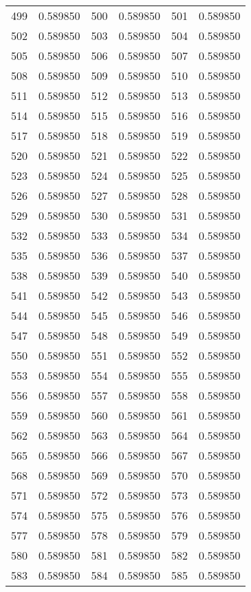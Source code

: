 \documentclass[12pt]{article}
\begin{document}
\begin{longtable}{@{}cc|cc|cc@{}}
499 & 0.589850 & 500 & 0.589850 & 501 & 0.589850 \\
502 & 0.589850 & 503 & 0.589850 & 504 & 0.589850 \\
505 & 0.589850 & 506 & 0.589850 & 507 & 0.589850 \\
508 & 0.589850 & 509 & 0.589850 & 510 & 0.589850 \\
511 & 0.589850 & 512 & 0.589850 & 513 & 0.589850 \\
514 & 0.589850 & 515 & 0.589850 & 516 & 0.589850 \\
517 & 0.589850 & 518 & 0.589850 & 519 & 0.589850 \\
520 & 0.589850 & 521 & 0.589850 & 522 & 0.589850 \\
523 & 0.589850 & 524 & 0.589850 & 525 & 0.589850 \\
526 & 0.589850 & 527 & 0.589850 & 528 & 0.589850 \\
529 & 0.589850 & 530 & 0.589850 & 531 & 0.589850 \\
532 & 0.589850 & 533 & 0.589850 & 534 & 0.589850 \\
535 & 0.589850 & 536 & 0.589850 & 537 & 0.589850 \\
538 & 0.589850 & 539 & 0.589850 & 540 & 0.589850 \\
541 & 0.589850 & 542 & 0.589850 & 543 & 0.589850 \\
544 & 0.589850 & 545 & 0.589850 & 546 & 0.589850 \\
547 & 0.589850 & 548 & 0.589850 & 549 & 0.589850 \\
550 & 0.589850 & 551 & 0.589850 & 552 & 0.589850 \\
553 & 0.589850 & 554 & 0.589850 & 555 & 0.589850 \\
556 & 0.589850 & 557 & 0.589850 & 558 & 0.589850 \\
559 & 0.589850 & 560 & 0.589850 & 561 & 0.589850 \\
562 & 0.589850 & 563 & 0.589850 & 564 & 0.589850 \\
565 & 0.589850 & 566 & 0.589850 & 567 & 0.589850 \\
568 & 0.589850 & 569 & 0.589850 & 570 & 0.589850 \\
571 & 0.589850 & 572 & 0.589850 & 573 & 0.589850 \\
574 & 0.589850 & 575 & 0.589850 & 576 & 0.589850 \\
577 & 0.589850 & 578 & 0.589850 & 579 & 0.589850 \\
580 & 0.589850 & 581 & 0.589850 & 582 & 0.589850 \\
583 & 0.589850 & 584 & 0.589850 & 585 & 0.589850 \\

\end{longtable}
\end{document}
